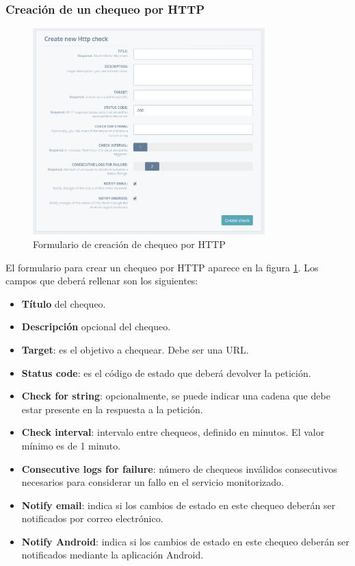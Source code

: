 \subsubsection{Creación de un chequeo por HTTP}

\begin{figure}[hbtp]
  \centering
  \includegraphics[width=0.8\textwidth]{apendice_manual_usuario/pantalla_crear_http.png}
  \caption{Formulario de creación de chequeo por HTTP}
  \label{fig:crear-http}
\end{figure}

El formulario para crear un chequeo por HTTP aparece en la figura
\ref{fig:crear-http}. Los campos que deberá rellenar son los siguientes:

\begin{itemize}
\item \textbf{Título} del chequeo.
\item \textbf{Descripción} opcional del chequeo.
\item \textbf{Target}: es el objetivo a chequear. Debe ser una URL.
\item \textbf{Status code}: es el código de estado que deberá devolver la petición.
\item \textbf{Check for string}: opcionalmente, se puede indicar una cadena que
  debe estar presente en la respuesta a la petición.
\item \textbf{Check interval}: intervalo entre chequeos, definido en minutos. El
  valor mínimo es de 1 minuto.
\item \textbf{Consecutive logs for failure}: número de chequeos inválidos
  consecutivos necesarios para considerar un fallo en el servicio monitorizado.
\item \textbf{Notify email}: indica si los cambios de estado en este chequeo
  deberán ser notificados por correo electrónico.
\item \textbf{Notify Android}: indica si los cambios de estado en este chequeo
  deberán ser notificados mediante la aplicación Android.
\end{itemize}


